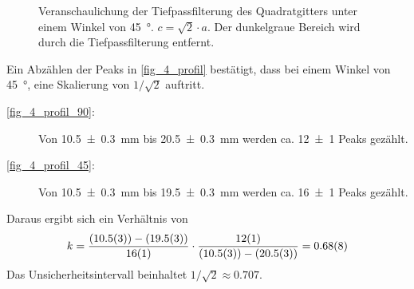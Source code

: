\documentclass[
	a4paper,
	12pt,
	pagesize,
	ngerman
]{scrartcl}
\begin{document}
\begin{itemize}
\begin{figure}[H]
			\caption{
				Veranschaulichung der Tiefpassfilterung des Quadratgitters unter einem Winkel von \SI{45}{\degree}. $c=\sqrt{2} \cdot a$. Der dunkelgraue Bereich wird durch die Tiefpassfilterung entfernt.
			}
			\label{fig_matrix}
	\end{figure}
	Ein Abzählen der Peaks in \cref{fig_4_profil} bestätigt, dass bei einem Winkel von \SI{45}{\degree}, eine Skalierung von $1/\sqrt{2}$ auftritt.
	\begin{description}
		\item[\cref{fig_4_profil_90}:] Von \SI{10.5+-0.3}{mm} bis \SI{20.5+-0.3}{mm} werden ca. \SI{12+-1}{} Peaks gezählt.
		\item[\cref{fig_4_profil_45}:] Von \SI{10.5+-0.3}{mm} bis \SI{19.5+-0.3}{mm} werden ca. \SI{16+-1}{} Peaks gezählt.
	\end{description}
	Daraus ergibt sich ein Verhältnis von
	\begin{equation}
			k = \frac{(\SI{10.5+-0.3}{})-(\SI{19.5+-0.3}{})}{\SI{16+-1}{}} \cdot \frac{\SI{12+-1}{}}{(\SI{10.5+-0.3}{})-(\SI{20.5+-0.3}{})} = \SI{0.68+-0.08}{}
	\end{equation}
	Das Unsicherheitsintervall beinhaltet $1/\sqrt{2}\approx \num{0,707}$.


\end{itemize}
\end{document}
